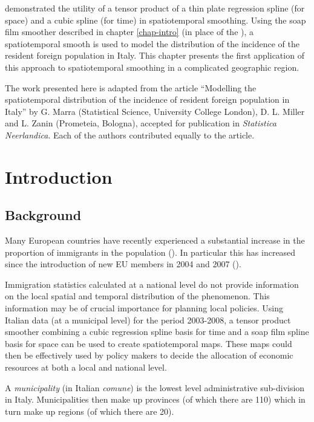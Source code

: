 \label{chap-it}

 demonstrated the utility of a tensor product of a thin plate regression spline (for space) and a cubic spline (for time) in spatiotemporal smoothing. Using the soap film smoother described in chapter \ref{chap-intro} (in place of the \tprs), a spatiotemporal smooth is used to model the distribution of the incidence of the resident foreign population in Italy. This chapter presents the first application of this approach to spatiotemporal smoothing in a complicated geographic region. 

The work presented here is adapted from the article ``Modelling the spatiotemporal distribution of the incidence of resident foreign population in Italy'' by G. Marra (Statistical Science, University College London), D. L. Miller and L. Zanin (Prometeia, Bologna), accepted for publication in \textit{Statistica Neerlandica}. Each of the authors contributed equally to the article.

\section{Introduction \label{IN}}

\subsection{Background}

Many European countries have recently experienced a substantial increase in the proportion of immigrants in the population (\cite{Manning2010}). In particular this has increased since the introduction of new EU members in 2004 and 2007 (\cite{euexpansion}). 

Immigration statistics calculated at a national level do not provide information on the local spatial and temporal distribution of the phenomenon. This information may be of crucial importance for planning local policies. Using Italian data (at a municipal level) for the period 2003-2008, a tensor product smoother combining a cubic regression spline basis for time and a soap film spline basis for space can be used to create spatiotemporal maps. These maps could then be effectively used by policy makers to decide the allocation of economic resources at both a local and national level.

A \textit{municipality} (in Italian \textit{comune}) is the lowest level administrative sub-division in Italy. Municipalities then make up provinces (of which there are 110) which in turn make up regions (of which there are 20).

